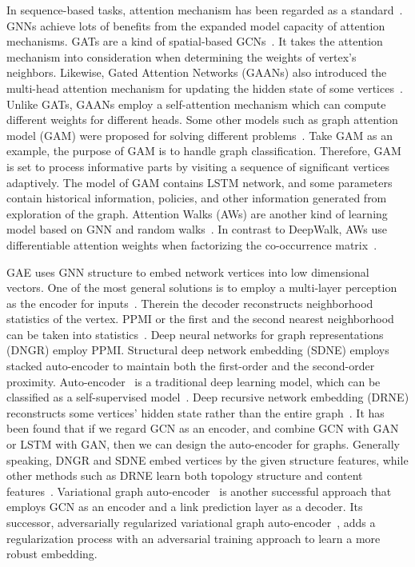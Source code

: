 In sequence-based tasks, attention mechanism has been regarded as a standard~. GNNs achieve lots of benefits from the expanded model capacity of attention mechanisms. GATs are a kind of spatial-based GCNs~. It takes the attention mechanism into consideration when determining the weights of vertex's neighbors. Likewise, Gated Attention Networks (GAANs) also introduced the multi-head attention mechanism for updating the hidden state of some vertices~. Unlike GATs, GAANs employ a self-attention mechanism which can compute different weights for different heads. Some other models such as graph attention model (GAM) were proposed for solving different problems~. Take GAM as an example, the purpose of GAM is to handle graph classification. Therefore, GAM is set to process informative parts by visiting a sequence of significant vertices adaptively. The model of GAM contains LSTM network, and some parameters contain historical information, policies, and other information generated from exploration of the graph. Attention Walks (AWs) are another kind of learning model based on GNN and random walks~. In contrast to DeepWalk, AWs use differentiable attention weights when factorizing the co-occurrence matrix~.

GAE uses GNN structure to embed network vertices into low dimensional vectors. One of the most general solutions is to employ a multi-layer perception as the encoder for inputs~. Therein the decoder reconstructs neighborhood statistics of the vertex. PPMI or the first and the second nearest neighborhood can be taken into statistics~. Deep neural networks for graph representations (DNGR) employ PPMI. Structural deep network embedding (SDNE) employs stacked auto-encoder to maintain both the first-order and the second-order proximity. Auto-encoder~ is a traditional deep learning model, which can be classified as a self-supervised model~. Deep recursive network embedding (DRNE) reconstructs some vertices' hidden state rather than the entire graph~. It has been found that if we regard GCN as an encoder, and combine GCN with GAN or LSTM with GAN, then we can design the auto-encoder for graphs. Generally speaking, DNGR and SDNE embed vertices by the given structure features, while other methods such as DRNE learn both topology structure and content features~. Variational graph auto-encoder~ is another successful approach that employs GCN as an encoder and a link prediction layer as a decoder. Its successor, adversarially regularized variational graph auto-encoder~, adds a regularization process with an adversarial training approach to learn a more robust embedding.


